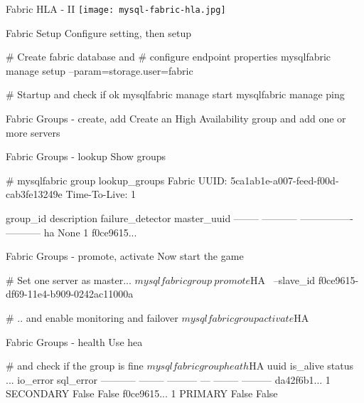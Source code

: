 \documentclass{beamer}[10]
\begin{document}
\begin{pyframe}{Fabric HLA - II}
\texttt{[image: mysql-fabric-hla.jpg]}
\end{pyframe}


\begin{pyframe}{Fabric Setup}
Configure  setting, then setup
\begin{bashcode}
# Create fabric database and
# configure endpoint properties
mysqlfabric manage setup --param=storage.user=fabric

# Startup and check if ok
mysqlfabric manage start
mysqlfabric manage ping
\end{bashcode}
\end{pyframe}


\begin{pyframe}{Fabric Groups - create, add}
Create an High Availability group and add one or more servers
\end{pyframe}


\begin{pyframe}{Fabric Groups - lookup}
Show groups
\begin{bashcode}
# mysqlfabric group lookup_groups
Fabric UUID:  5ca1ab1e-a007-feed-f00d-cab3fe13249e
Time-To-Live: 1

group_id description failure_detector master_uuid
-------- ----------- ---------------- -----------
      ha        None                1 f0ce9615...

\end{bashcode}
\end{pyframe}

\begin{pyframe}{Fabric Groups - promote, activate}
Now start the game
\begin{bashcode}
# Set one server as master...
$ mysqlfabric group \
    promote $HA \
     --slave_id f0ce9615-df69-11e4-b909-0242ac11000a

# .. and enable monitoring and failover
$ mysqlfabric group activate $HA
\end{bashcode}
\end{pyframe}


\begin{pyframe}{Fabric Groups - health}
Use hea
\begin{bashcode}

# and check if the group is fine
$ mysqlfabric group heath $HA
       uuid is_alive    status ... io_error sql_error
----------- -------- --------- --- -------- ---------
da42f6b1...        1 SECONDARY        False     False
f0ce9615...        1   PRIMARY        False     False
\end{bashcode}
\end{pyframe}
\end{document}
